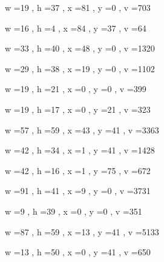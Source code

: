 \documentclass[11pt]{article}
\begin{document}
w =19 , h =37 , x =81 , y =0 , v =703
\par
w =16 , h =4 , x =84 , y =37 , v =64
\par
w =33 , h =40 , x =48 , y =0 , v =1320
\par
w =29 , h =38 , x =19 , y =0 , v =1102
\par
w =19 , h =21 , x =0 , y =0 , v =399
\par
w =19 , h =17 , x =0 , y =21 , v =323
\par
w =57 , h =59 , x =43 , y =41 , v =3363
\par
w =42 , h =34 , x =1 , y =41 , v =1428
\par
w =42 , h =16 , x =1 , y =75 , v =672
\par
\newpage




w =91 , h =41 , x =9 , y =0 , v =3731
\par
w =9 , h =39 , x =0 , y =0 , v =351
\par
w =87 , h =59 , x =13 , y =41 , v =5133
\par
w =13 , h =50 , x =0 , y =41 , v =650
\par
\newpage
\end{document}
